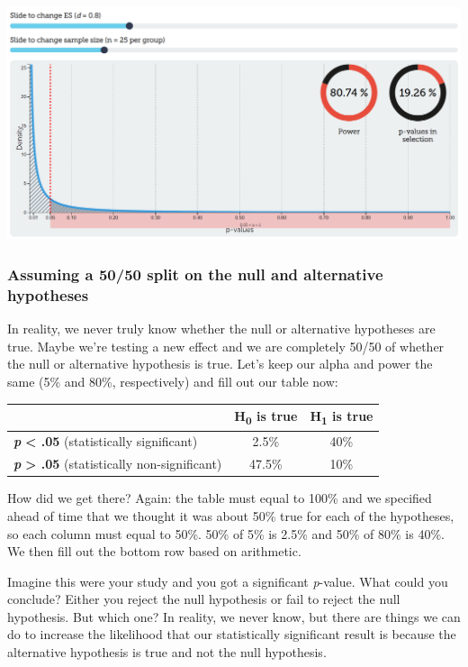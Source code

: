 \documentclass[
]{book}
\begin{document}
\includegraphics{images/05-bean/alternative.png}

\hypertarget{assuming-a-5050-split-on-the-null-and-alternative-hypotheses}{%
\subsubsection{Assuming a 50/50 split on the null and alternative hypotheses}\label{assuming-a-5050-split-on-the-null-and-alternative-hypotheses}}

In reality, we never truly know whether the null or alternative hypotheses are true. Maybe we're testing a new effect and we are completely 50/50 of whether the null or alternative hypothesis is true. Let's keep our alpha and power the same (5\% and 80\%, respectively) and fill out our table now:

\begin{longtable}[]{@{}lcc@{}}
\toprule
& H\textsubscript{0} is true & H\textsubscript{1} is true\tabularnewline
\midrule
\endhead
\textbf{\emph{p}} \textbf{\textless{} .05} (statistically significant) & 2.5\% & 40\%\tabularnewline
\textbf{\emph{p}} \textbf{\textgreater{} .05} (statistically non-significant) & 47.5\% & 10\%\tabularnewline
\bottomrule
\end{longtable}

How did we get there? Again: the table must equal to 100\% and we specified ahead of time that we thought it was about 50\% true for each of the hypotheses, so each column must equal to 50\%. 50\% of 5\% is 2.5\% and 50\% of 80\% is 40\%. We then fill out the bottom row based on arithmetic.

Imagine this were your study and you got a significant \emph{p}-value. What could you conclude? Either you reject the null hypothesis or fail to reject the null hypothesis. But which one? In reality, we never know, but there are things we can do to increase the likelihood that our statistically significant result is because the alternative hypothesis is true and not the null hypothesis.
\end{document}
